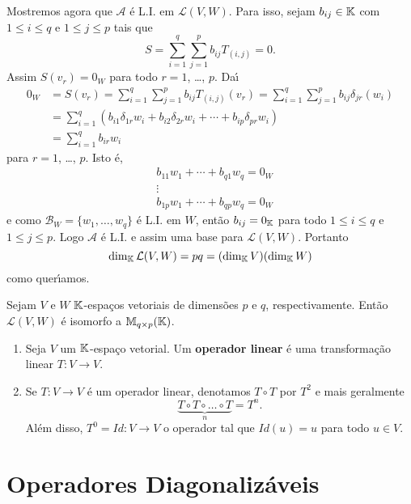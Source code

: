 \begin{prova}
	Mostremos agora que $\mathcal{A}$ \'e L.I. em $\mathcal{L}(V,W)$. Para isso, sejam $b_{ij} \in \mathbb{K}$ com $1 \le i \le q$ e $1 \le j \le p$ tais que
	\[
		S = \sum_{i = 1}^q\sum_{j = 1}^pb_{ij}T_{(i,j)} = 0.
	\]
	Assim $S(v_r) = 0_W$ para todo $r = 1$, \dots, $p$. Da{\'\i}
	\begin{align*}
		0_W &= S(v_r) = \sum_{i = 1}^q\sum_{j = 1}^pb_{ij}T_{(i,j)}(v_r) = \sum_{i = 1}^q\sum_{j = 1}^pb_{ij}\delta_{jr}(w_i)\\ &= \sum_{i = 1}^q(b_{i1}\delta_{1r}w_i + b_{i2}\delta_{2r}w_i + \cdots + b_{ip}\delta_{pr}w_i)\\ &= \sum_{i = 1}^qb_{ir}w_i
	\end{align*}
	para $r = 1$, \dots, $p$. Isto \'e,
	\begin{align*}
		&b_{11}w_1 + \cdots + b_{q1}w_q = 0_W\\
		&\vdots\\
		&b_{1p}w_1 + \cdots + b_{qp}w_q = 0_W
	\end{align*}
	e como $\mathcal{B}_W = \{w_1,\dots,w_q\}$ \'e L.I. em $W$, ent\~ao $b_{ij} = 0_{\mathbb{K}}$ para todo $1 \le i \le q$ e $1 \le j \le p$. Logo $\mathcal{A}$ \'e L.I. e assim uma base para $\mathcal{L}(V,W)$. Portanto
	\[
		\dim_{\mathbb{K}}\mathcal{L}(V,W) = pq = (\dim_{\mathbb{K}}V)(\dim_{\mathbb{K}}W)
	\]
	como quer{\'\i}amos.
\end{prova}

\begin{corolario}
	Sejam $V$ e $W$ $\mathbb{K}$-espa\c{c}os vetoriais de dimens\~oes $p$ e $q$, respectivamente. Ent\~ao $\mathcal{L}(V,W)$ \'e isomorfo a $\mathbb{M}_{q\times p}(\mathbb{K})$.
\end{corolario}

\begin{definicao}
	\begin{enumerate}[label=({\roman*})]
		\item Seja $V$ um $\mathbb{K}$-espa\c{c}o vetorial. Um \textbf{operador linear} \'e uma transforma\c{c}\~ao linear $T : V \to V$.
		\item Se $T : V \to V$ \'e um operador linear, denotamos $T \circ T$ por $T^2$ e mais geralmente
		\[
			\underbrace{T \circ T \circ \dots \circ T}_{n} = T^n.
		\]
		Al\'em disso, $T^0 = Id : V \to V$ o operador tal que $Id(u) = u$ para todo $u \in V$.
	\end{enumerate}
\end{definicao}

\section{Operadores Diagonaliz\'aveis} %
\label{sec:operadores_diagonalizaveis}

